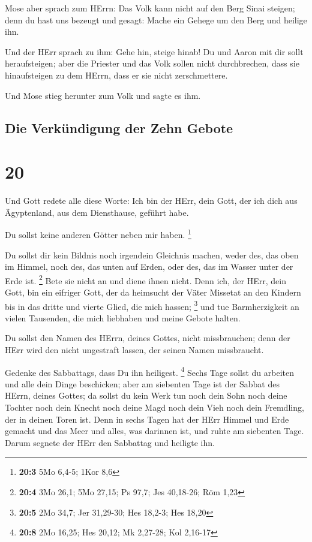  Mose aber sprach zum HErrn: Das Volk kann nicht auf den
Berg Sinai steigen; denn du hast uns bezeugt und gesagt: Mache ein
Gehege um den Berg und heilige ihn.

 Und der HErr sprach zu ihm: Gehe hin, steige hinab! Du
und Aaron mit dir sollt heraufsteigen; aber die Priester und das Volk
sollen nicht durchbrechen, dass sie hinaufsteigen zu dem HErrn, dass er
sie nicht zerschmettere.

 Und Mose stieg herunter zum Volk und sagte es ihm.

\hypertarget{die-verkuxfcndigung-der-zehn-gebote}{%
\subsection{Die Verkündigung der Zehn
Gebote}\label{die-verkuxfcndigung-der-zehn-gebote}}

\hypertarget{section-19}{%
\section{20}\label{section-19}}

 Und Gott redete alle diese Worte:  Ich bin
der HErr, dein Gott, der ich dich aus Ägyptenland, aus dem Diensthause,
geführt habe.

 Du sollst keine anderen Götter neben mir haben.
\footnote{\textbf{20:3} 5Mo 6,4-5; 1Kor 8,6}

 Du sollst dir kein Bildnis noch irgendein Gleichnis
machen, weder des, das oben im Himmel, noch des, das unten auf Erden,
oder des, das im Wasser unter der Erde ist. \footnote{\textbf{20:4} 3Mo
  26,1; 5Mo 27,15; Ps 97,7; Jes 40,18-26; Röm 1,23}  Bete
sie nicht an und diene ihnen nicht. Denn ich, der HErr, dein Gott, bin
ein eifriger Gott, der da heimsucht der Väter Missetat an den Kindern
bis in das dritte und vierte Glied, die mich hassen; \footnote{\textbf{20:5}
  2Mo 34,7; Jer 31,29-30; Hes 18,2-3; Hes 18,20}  und tue
Barmherzigkeit an vielen Tausenden, die mich liebhaben und meine Gebote
halten.

 Du sollst den Namen des HErrn, deines Gottes, nicht
missbrauchen; denn der HErr wird den nicht ungestraft lassen, der seinen
Namen missbraucht.

 Gedenke des Sabbattags, dass Du ihn heiligest.
\footnote{\textbf{20:8} 2Mo 16,25; Hes 20,12; Mk 2,27-28; Kol 2,16-17}
 Sechs Tage sollst du arbeiten und alle dein Dinge
beschicken;  aber am siebenten Tage ist der Sabbat des
HErrn, deines Gottes; da sollst du kein Werk tun noch dein Sohn noch
deine Tochter noch dein Knecht noch deine Magd noch dein Vieh noch dein
Fremdling, der in deinen Toren ist.  Denn in sechs Tagen
hat der HErr Himmel und Erde gemacht und das Meer und alles, was
darinnen ist, und ruhte am siebenten Tage. Darum segnete der HErr den
Sabbattag und heiligte ihn.

